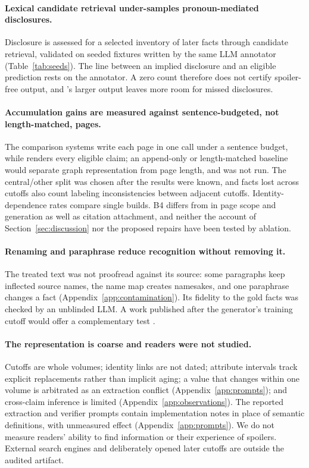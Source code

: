\paragraph{Lexical candidate retrieval under-samples pronoun-mediated disclosures.}
Disclosure is assessed for a selected inventory of later facts through candidate retrieval,
validated on seeded fixtures written by the same LLM annotator (Table~\ref{tab:seeds}). The
line between an implied disclosure and an eligible prediction rests on the annotator. A zero
count therefore does not certify spoiler-free output, and \sys's larger output leaves more
room for missed disclosures.

\paragraph{Accumulation gains are measured against sentence-budgeted, not length-matched, pages.}
The comparison systems write each page in one call under a sentence budget, while \sys
renders every eligible claim; an append-only or length-matched baseline would separate graph
representation from page length, and was not run. The central/other split was chosen after
the results were known, and facts lost across cutoffs also count labeling inconsistencies
between adjacent cutoffs. Identity-dependence rates compare single builds. B4 differs from
\sys in page scope and generation as well as citation attachment, and neither the account of
Section~\ref{sec:discussion} nor the proposed repairs have been tested by ablation.

\paragraph{Renaming and paraphrase reduce recognition without removing it.}
The treated text was not proofread against its source: some paragraphs keep inflected
source names, the name map creates namesakes, and one paraphrase changes a fact
(Appendix~\ref{app:contamination}). Its fidelity to the gold facts was checked by an
unblinded LLM. A work published after the generator's training cutoff would offer a
complementary test \citep{karpinska2024nocha}.

\paragraph{The representation is coarse and readers were not studied.}
Cutoffs are whole volumes; identity links are not dated; attribute intervals track explicit
replacements rather than implicit aging; a value that changes within one volume is
arbitrated as an extraction conflict (Appendix~\ref{app:prompts}); and cross-claim inference
is limited (Appendix~\ref{app:observations}). The reported extraction and verifier prompts
contain implementation notes in place of semantic definitions, with unmeasured effect
(Appendix~\ref{app:prompts}). We do not measure readers' ability to find
information or their experience of spoilers. External search engines and deliberately opened
later cutoffs are outside the audited artifact.
